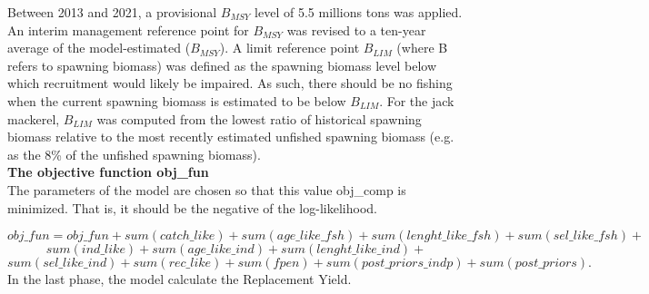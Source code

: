 \documentclass{article}
\begin{document}
Between 2013 and 2021, a provisional \(B_{MSY}\) level of 5.5 millions tons was applied. 
An interim management reference point for \(B_{MSY}\) was revised to a ten-year average of the model-estimated (\(B_{MSY}\)). 
A limit reference point \(B_{LIM}\) (where B refers to spawning biomass) was defined as the spawning biomass level below which recruitment would likely be impaired. As such, there should be no fishing when the current spawning biomass is estimated to be below \(B_{LIM}\).
For the jack mackerel, \(B_{LIM}\) was computed from the lowest ratio of historical spawning biomass relative to the most recently estimated unfished spawning biomass (e.g. as the 8\% of the unfished spawning biomass).\\








\textbf{The objective function obj\_fun}\\

The parameters of the model are chosen so that this value obj\_comp is minimized. That is, it should be the negative of the log-likelihood.

\begin{equation}
    obj\_fun=obj\_fun+sum(catch\_like)+sum(age\_like\_fsh)+sum(lenght\_like\_fsh)+sum(sel\_like\_fsh)+
\end{equation}
\begin{equation*}
    sum(ind\_like)+sum(age\_like\_ind)+sum(lenght\_like\_ind)+
\end{equation*}
\begin{equation*}
    sum(sel\_like\_ind)+sum(rec\_like)+sum(fpen)+sum(post\_priors\_indp)+sum(post\_priors).
\end{equation*}
In the last phase, the model calculate the Replacement Yield.\\
\end{document}
